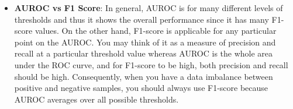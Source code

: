 \documentclass[11pt, twocolumn]{article}
\begin{document}
\begin{itemize}
\begin{itemize}
\item \textbf{AUROC vs F1 Score}:
In general, AUROC is for many different levels of thresholds and thus it shows the overall performance since it has many F1-score values. On the other hand, F1-score is applicable for any {\color{blue}particular point} on the AUROC.
You may think of it as a measure of precision and recall at a particular threshold value whereas AUROC is the whole area under the ROC curve, and for F1-score to be high, both precision and recall should be high.
{\color{blue}Consequently},  when you have a data {\color{red}imbalance} between positive and negative samples, you should always use F1-score because AUROC {\color{red}averages} over all possible thresholds.
\end{itemize}
\end{itemize}
\end{document}
